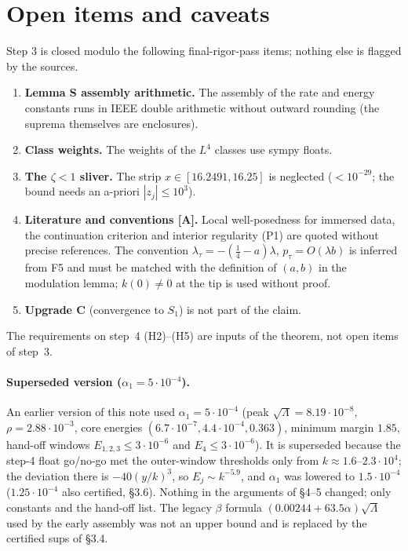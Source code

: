 \documentclass[11pt]{article}
\theoremstyle{definition}
\theoremstyle{remark}
\newcommand{\fn}[1]{\texttt{\detokenize{#1}}}
\newcommand{\tA}{\textsc{[A]}}
\begin{document}
\section{Open items and caveats}
Step 3 is closed modulo the following final-rigor-pass items; nothing else is flagged by the sources.
\begin{enumerate}[leftmargin=*]
\item \textbf{Lemma S assembly arithmetic.} The assembly of the rate and energy constants runs in IEEE double arithmetic without outward rounding (the suprema themselves are \fn{arb} enclosures).
\item \textbf{Class weights.} The weights of the $L^4$ classes use sympy floats.
\item \textbf{The $\zeta<1$ sliver.} The strip $x\in[16.2491,16.25]$ is neglected ($<10^{-29}$; the bound needs an a-priori $|z_j|\le10^3$).
\item \textbf{Literature and conventions \tA.} Local well-posedness for immersed data, the continuation criterion and interior regularity (P1) are quoted without precise references. The convention $\lambda_\tau=-(\tfrac14-a)\lambda$, $p_\tau=O(\lambda b)$ is inferred from \fn{STEP3_FIXPLAN.md} F5 and must be matched with the definition of $(a,b)$ in the modulation lemma; $k(0)\ne0$ at the tip is used without proof.
\item \textbf{Upgrade C} (convergence to $S_1$) is not part of the claim.
\end{enumerate}
The requirements on step~4 (H2)--(H5) are inputs of the theorem, not open items of step~3.

\paragraph{Superseded version ($\alpha_1=5\cdot10^{-4}$).} An earlier version of this note used $\alpha_1=5\cdot10^{-4}$ (peak $\sqrt\Lambda=8.19\cdot10^{-8}$, $\rho=2.88\cdot10^{-3}$, core energies $(6.7\cdot10^{-7},4.4\cdot10^{-4},0.363)$, minimum margin $1.85$, hand-off windows $E_{1,2,3}\le3\cdot10^{-6}$ and $E_4\le3\cdot10^{-6}$). It is superseded because the step-4 float go/no-go met the outer-window thresholds only from $k\approx1.6$--$2.3\cdot10^4$; the deviation there is $-40(y/k)^3$, so $E_j\sim k^{-5.9}$, and $\alpha_1$ was lowered to $1.5\cdot10^{-4}$ ($1.25\cdot10^{-4}$ also certified, \S3.6). Nothing in the arguments of \S4--5 changed; only constants and the hand-off list. The legacy $\beta$ formula $(0.00244+63.5\alpha)\sqrt\Lambda$ used by the early assembly was not an upper bound and is replaced by the certified sups of \S3.4.
\end{document}
